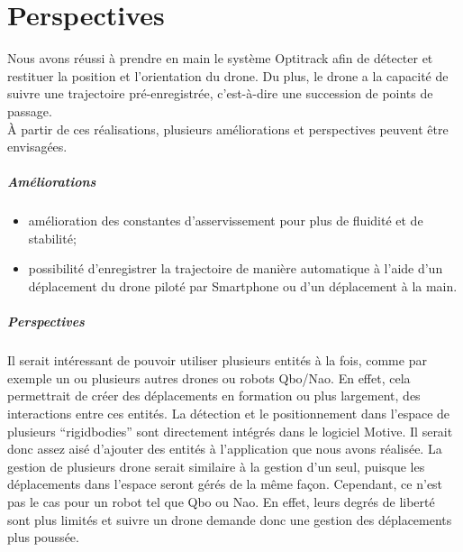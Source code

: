 \chapter{Perspectives}
    Nous avons réussi à prendre en main le système Optitrack afin de détecter et restituer la position et l'orientation du drone. Du plus, le drone a la capacité de suivre une trajectoire pré-enregistrée, c'est-à-dire une succession de points de passage. \\

    À partir de ces réalisations, plusieurs améliorations et perspectives peuvent être envisagées.

    \paragraph{Améliorations}
    \begin{itemize}
        \item amélioration des constantes d'asservissement pour plus de fluidité et de stabilité;
        \item possibilité d'enregistrer la trajectoire de manière automatique à l'aide d'un déplacement du drone piloté par Smartphone ou d'un déplacement à la main.
    \end{itemize}


    \paragraph{Perspectives}
    Il serait intéressant de pouvoir utiliser plusieurs entités à la fois, comme par exemple un ou plusieurs autres drones ou robots Qbo/Nao. En effet, cela permettrait de créer des déplacements en formation ou plus largement, des interactions entre ces entités. La détection et le positionnement dans l'espace de plusieurs ``rigidbodies'' sont directement intégrés dans le logiciel Motive. Il serait donc assez aisé d'ajouter des entités à l'application que nous avons réalisée. La gestion de plusieurs drone serait similaire à la gestion d'un seul, puisque les déplacements dans l'espace seront gérés de la même façon. Cependant, ce n'est pas le cas pour un robot tel que Qbo ou Nao. En effet, leurs degrés de liberté sont plus limités et suivre un drone demande donc une gestion des déplacements plus poussée.
